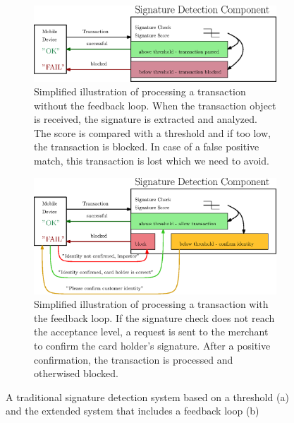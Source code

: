 \documentclass[a4paper, oneside]{csthesis}
\begin{document}
\begin{figure}
        \centering
        \begin{subfigure}[b]{\textwidth}
                \centering
                \includegraphics[width=1\textwidth]{figures/fb-loop1.eps}
                \caption{Simplified illustration of processing a transaction without the feedback loop. When the transaction object is received, the signature is extracted and analyzed. The score is compared with a threshold and if too low, the transaction is blocked. In case of a false positive match, this transaction is lost which we need to avoid.}
                \label{fig:fb-loop1}
        \end{subfigure}%

        \begin{subfigure}[b]{\textwidth}
                \centering
                \includegraphics[width=1\textwidth]{figures/fb-loop2.eps}
                \caption{Simplified illustration of processing a transaction with the feedback loop. If the signature check does not reach the acceptance level, a request is sent to the merchant to confirm the card holder's signature. After a positive confirmation, the transaction is processed and otherwised blocked.}
                \label{fig:fb-loop2}
        \end{subfigure}%
        \caption{A traditional signature detection system based on a threshold (a) and the extended system that includes a feedback loop (b) }
        \label{fig:feedback-loop}
\end{figure}
\end{document}
